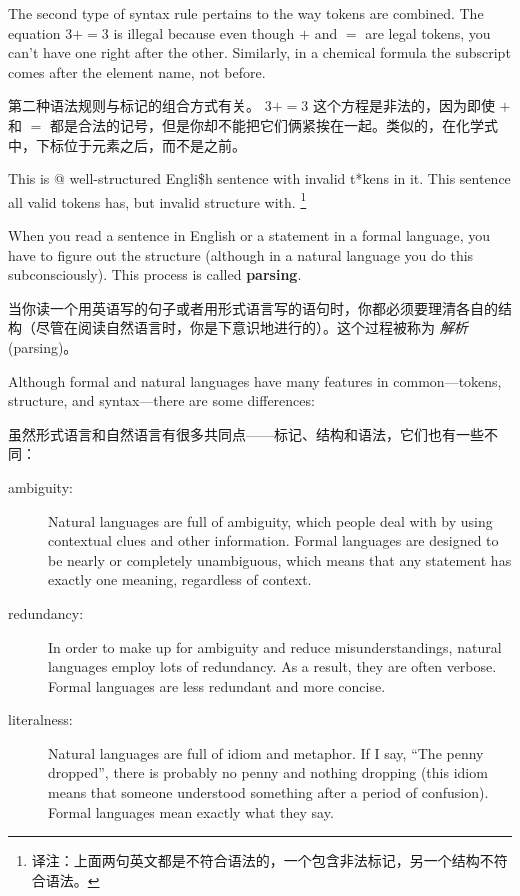 The second type of syntax rule pertains to the way tokens are
combined.  The equation $3 += 3$ is illegal because even though $+$
and $=$ are legal tokens, you can't have one right after the other.
Similarly, in a chemical formula the subscript comes after the element
name, not before.

第二种语法规则与标记的组合方式有关。 $3 + = 3$ 这个方程是非法的，因为即使 $+$ 和 $=$ 都是合法的记号，但是你却不能把它们俩紧挨在一起。类似的，在化学式中，下标位于元素之后，而不是之前。

This is @ well-structured Engli\$h
sentence with invalid t*kens in it.  This sentence all valid tokens
has, but invalid structure with. \footnote{译注：上面两句英文都是不符合语法的，一个包含非法标记，另一个结构不符合语法。}

When you read a sentence in English or a statement in a formal
language, you have to figure out the structure
(although in a natural language you do this subconsciously).  This
process is called {\bf parsing}.

当你读一个用英语写的句子或者用形式语言写的语句时，你都必须要理清各自的结构（尽管在阅读自然语言时，你是下意识地进行的）。这个过程被称为 \emph{解析} (parsing)。
  

Although formal and natural languages have many features in
common---tokens, structure, and syntax---there are some
differences:

虽然形式语言和自然语言有很多共同点——标记、结构和语法，它们也有一些不同：
    

\begin{description}

\item[ambiguity:] Natural languages are full of ambiguity, which
people deal with by using contextual clues and other information.
Formal languages are designed to be nearly or completely unambiguous,
which means that any statement has exactly one meaning,
regardless of context.

\item[redundancy:] In order to make up for ambiguity and reduce
misunderstandings, natural languages employ lots of
redundancy.  As a result, they are often verbose.  Formal languages
are less redundant and more concise.

\item[literalness:] Natural languages are full of idiom and metaphor.
If I say, ``The penny dropped'', there is probably no penny and
nothing dropping (this idiom means that someone understood something
after a period of confusion).  Formal languages
mean exactly what they say.

\end{description}


